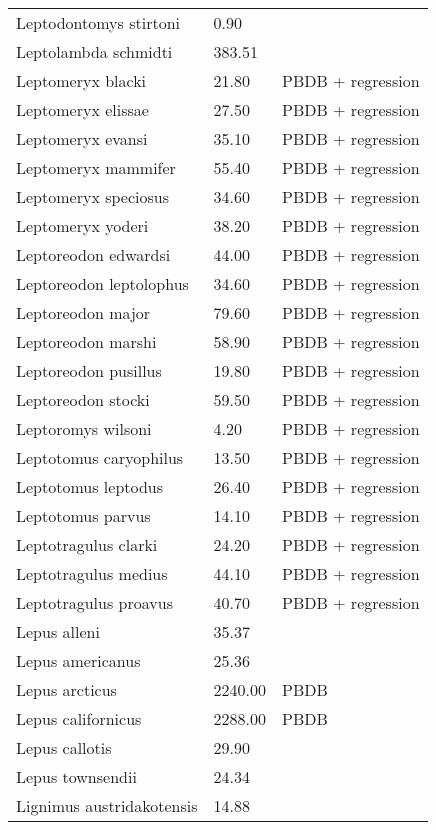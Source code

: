 \begin{longtable}{p{} p{} p{}}
    Leptodontomys stirtoni & 0.90 & \cite{Stock1937} \\ 
    Leptolambda schmidti & 383.51 & \cite{Zack2005} \\ 
    Leptomeryx blacki & 21.80 & PBDB + regression \\ 
    Leptomeryx elissae & 27.50 & PBDB + regression \\ 
    Leptomeryx evansi & 35.10 & PBDB + regression \\ 
    Leptomeryx mammifer & 55.40 & PBDB + regression \\ 
    Leptomeryx speciosus & 34.60 & PBDB + regression \\ 
    Leptomeryx yoderi & 38.20 & PBDB + regression \\ 
    Leptoreodon edwardsi & 44.00 & PBDB + regression \\ 
    Leptoreodon leptolophus & 34.60 & PBDB + regression \\ 
    Leptoreodon major & 79.60 & PBDB + regression \\ 
    Leptoreodon marshi & 58.90 & PBDB + regression \\ 
    Leptoreodon pusillus & 19.80 & PBDB + regression \\ 
    Leptoreodon stocki & 59.50 & PBDB + regression \\ 
    Leptoromys wilsoni & 4.20 & PBDB + regression \\ 
    Leptotomus caryophilus & 13.50 & PBDB + regression \\ 
    Leptotomus leptodus & 26.40 & PBDB + regression \\ 
    Leptotomus parvus & 14.10 & PBDB + regression \\ 
    Leptotragulus clarki & 24.20 & PBDB + regression \\ 
    Leptotragulus medius & 44.10 & PBDB + regression \\ 
    Leptotragulus proavus & 40.70 & PBDB + regression \\ 
    Lepus alleni & 35.37 & \cite{Smith2004} \\ 
    Lepus americanus & 25.36 & \cite{Smith2004} \\ 
    Lepus arcticus & 2240.00 & PBDB \\ 
    Lepus californicus & 2288.00 & PBDB \\ 
    Lepus callotis & 29.90 & \cite{Smith2004} \\ 
    Lepus townsendii & 24.34 & \cite{Smith2004} \\ 
    Lignimus austridakotensis & 14.88 & \cite{Tomiya2013} \\ 

\end{longtable}
